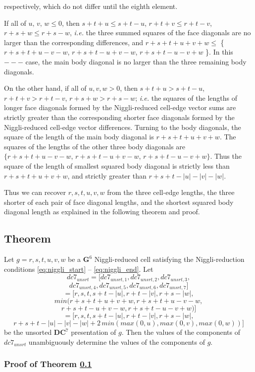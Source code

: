 \documentclass[preprint]{iucr}              %
\begin{document}
\vspace{-20mm}
\noindent{}respectively, which do not differ until the eighth element.

If all of $u,\,v,\,w \leq 0$, then $s+t+u \leq s+t-u$, 
$r+t+v \leq r+t-v$, $r+s+w \leq r+s-w$, {\it i.e.} the three summed
squares of the face diagonals are no larger than the corresponding differences,
and $r+s+t+u+v+w \leq $ \{ $r+s+t+u-v-w$, $r+s+t-u+v-w$, $r+s+t-u-v+w$ \}.
In this $---$ case, the main body diagonal is no larger than the three remaining body diagonals.

On the other hand, if all of $u,v,w > 0$, then $s+t+u > s+t-u$, 
$r+t+v > r+t-v$, $r+s+w > r+s-w$; {\it i.e.} the squares of the
lengths of longer face diagonals formed by the Niggli-reduced
cell-edge vector sums are strictly greater than the corresponding
shorter face diagonals formed by the Niggli-reduced
cell-edge vector differences.  Turning to the body diagonals,
the square of the length of the main body diagonal is
$r+s+t+u+v+w$.  The squares of the lengths of the other three
body diagonals are $ \{r+s+t+u-v-w$, $r+s+t-u+v-w$, $r+s+t-u-v+w\}$.
Thus the square of the length of smallest squared body diagonal is strictly less than $r+s+t+u+v+w$, and strictly greater than $r+s+t-|u|-|v|-|w|$.

Thus we can recover $r,s,t,u,v,w$ from the three cell-edge lengths,
the three shorter of each pair of face diagonal lengths, and the shortest squared body diagonal length
as explained in the following theorem and proof.

\subsection{Theorem}
\label{subsec::invert}

Let $g = {r,s,t,u,v,w}$ be a $\mathbf{G}^6$ Niggli-reduced
cell satisfying the Niggli-reduction conditions 
\ref{eq:niggli_start} -- \ref{eq:niggli_end}.  Let
\[ dc7_{unsrt}=[dc7_{unsrt,1},dc7_{unsrt,2},dc7_{unsrt,3},\]
\[ dc7_{unsrt,4},dc7_{unsrt,5},dc7_{unsrt,6},dc7_{unsrt,7} ] \]
\[ =[r,s,t,s+t-|u|,r+t-|v|,r+s-|w|,\] 
\[ min(r+s+t+u+v+w, r+s+t+u-v-w,\]
\[ r+s+t-u+v-w, r+s+t-u-v+w)]
\]
\[ =[r,s,t,s+t-|u|,r+t-|v|,r+s-|w|,\] 
\[ r+s+t-|u|-|v|-|w|+2\,min(max(0,u),max(0,v),max(0,w))]
\]
be the unsorted $\mathbf{DC}^{7}$ presentation of $g$.
Then the values of the components of $dc7_{unsrt}$
unambiguously determine the values of the components
of $g$.

\subsubsection{Proof of Theorem \ref{subsec::invert}}
~~\\
\end{document}
